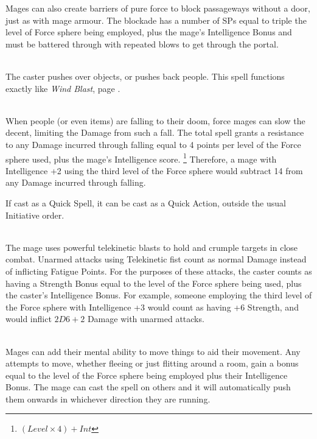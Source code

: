 \begin{multicols}{2}
Mages can also create barriers of pure force to block passageways without a door, just as with mage armour.
The blockade has a number of \glspl{SP} equal to triple the level of Force sphere being employed, plus the mage's Intelligence Bonus and must be battered through with repeated blows to get through the portal.

\\
The caster pushes over objects, or pushes back people.
This spell functions exactly like \textit{Wind Blast}, page \pageref{windblast}.

\\
When people (or even items) are falling to their doom, force mages can slow the decent, limiting the Damage from such a fall.
The total spell grants a resistance to any Damage incurred through falling equal to 4 points per level of the Force sphere used, plus the mage's Intelligence score.%
\footnote{$(Level \times 4) + Int$}
Therefore, a mage with Intelligence +2 using the third level of the Force sphere would subtract 14 from any Damage incurred through falling.

If cast as a Quick Spell, it can be cast as a Quick Action, outside the usual Initiative order.

\\
The mage uses powerful telekinetic blasts to hold and crumple targets in close combat.
Unarmed attacks using Telekinetic fist count as normal Damage instead of inflicting Fatigue Points.
For the purposes of these attacks, the caster counts as having a Strength Bonus equal to the level of the Force sphere being used, plus the caster's Intelligence Bonus.
For example, someone employing the third level of the Force sphere with Intelligence +3 would count as having +6 Strength, and would inflict $2D6+2$ Damage with unarmed attacks.

\\
Mages can add their mental ability to move things to aid their movement.
Any attempts to move, whether fleeing or just flitting around a room, gain a bonus equal to the level of the Force sphere being employed plus their Intelligence Bonus.
The mage can cast the spell on others and it will automatically push them onwards in whichever direction they are running.


\end{multicols}
